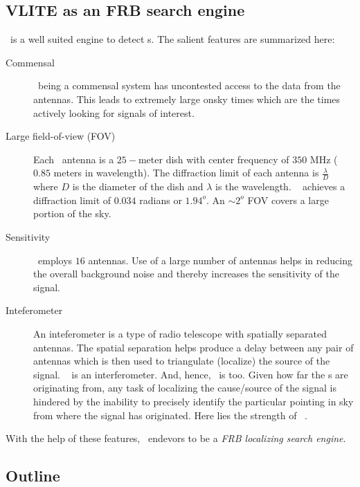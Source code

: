 \subsection{VLITE as an FRB search engine}
\label{ssub:vfrb}
\par \vlite~is a well suited engine to detect \frb{}s. The salient features are summarized here:
\begin{description}
	\item[Commensal] 
		\vlite~being a commensal system has uncontested access to the data from the \vla antennas.
		This leads to extremely large onsky times which are the times actively looking for signals of interest.
	\item[Large field-of-view (FOV)]
		Each \vlite~antenna is a $25-$meter dish with center frequency of $350$ MHz ($0.85$ meters in wavelength). 
		The diffraction limit of each antenna is $\frac{\lambda}{D}$ where $D$ is the diameter of the dish and $\lambda$ is the wavelength.  
		\vlite~ achieves a diffraction limit of $0.034$ radians or $1.94^o$. 
		An $\sim 2^o$ FOV covers a large portion of the sky. 

	\item[Sensitivity]
		\vlite~employs $16$ antennas.
		Use of a large number of antennas helps in reducing the overall background noise and thereby increases the sensitivity of the signal.
	
	\item[Inteferometer]
		An inteferometer is a type of radio telescope with spatially separated antennas. 
		The spatial separation helps produce a delay between any pair of antennas which is then used to triangulate (localize) the source of the signal. 
		\vla~ is an interferometer. And, hence, \vlite~is too.
		Given how far the \frb{}s are originating from, any task of localizing the cause/source of the signal is hindered by the inability to precisely identify the particular pointing in sky from where the signal has originated.
		Here lies the strength of \vlite~.
\end{description}

\par With the help of these features, \vlite~endevors to be a \emph{FRB localizing search engine}. 

\subsection{Outline}

